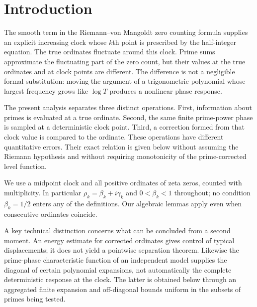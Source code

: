 \documentclass[11pt,reqno]{amsart}
\numberwithin{equation}{section}
\begin{document}
\begin{abstract}
the long-cutoff prime--zero covariance remains an explicit open target. No presently established uniform estimate certifies a new positive asymptotic percentage or RH.
\end{abstract}
\maketitle
\tableofcontents
\section{Introduction}
The smooth term in the Riemann--von Mangoldt zero counting formula supplies an explicit increasing clock whose $k$th point is prescribed by the half-integer equation. The true ordinates fluctuate around this clock. Prime sums approximate the fluctuating part of the zero count, but their values at the true ordinates and at clock points are different. The difference is not a negligible formal substitution: moving the argument of a trigonometric polynomial whose largest frequency grows like $\log T$ produces a nonlinear phase response.

The present analysis separates three distinct operations. First, information about primes is evaluated at a true ordinate. Second, the same finite prime-power phase is sampled at a deterministic clock point. Third, a correction formed from that clock value is compared to the ordinate. These operations have different quantitative errors. Their exact relation is given below without assuming the Riemann hypothesis and without requiring monotonicity of the prime-corrected level function.

We use a midpoint clock and all positive ordinates of zeta zeros, counted with multiplicity. In particular $\rho_k=\beta_k+i\gamma_k$ and $0<\beta_k<1$ throughout; no condition $\beta_k=1/2$ enters any of the definitions. Our algebraic lemmas apply even when consecutive ordinates coincide.

A key technical distinction concerns what can be concluded from a second moment. An energy estimate for corrected ordinates gives control of typical displacements; it does not yield a pointwise separation theorem. Likewise the prime-phase characteristic function of an independent model supplies the diagonal of certain polynomial expansions, not automatically the complete deterministic response at the clock. The latter is obtained below through an aggregated finite expansion and off-diagonal bounds uniform in the subsets of primes being tested.
\end{document}
